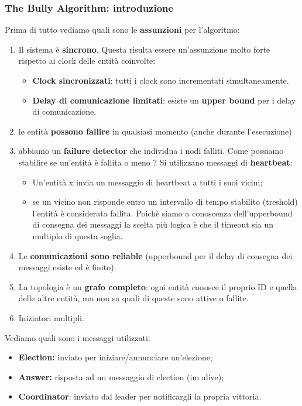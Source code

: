 \documentclass[12pt]{article}
\begin{document}
		\subsubsection{The Bully Algorithm: introduzione}
			Prima di tutto vediamo quali sono le \textbf{assunzioni} per l'algoritmo:
			\begin{enumerate}
				\item Il sistema è \textbf{sincrono}. Questa risulta essere un'assunzione molto forte rispetto ai clock delle entità coinvolte:
				\begin{itemize}
					\item \textbf{Clock sincronizzati}: tutti i clock sono incrementati simultaneamente.
					\item \textbf{Delay di comunicazione limitati}: esiste un \textbf{upper bound} per i delay di comunicazione.  
				\end{itemize}
				\item le entità \textbf{possono fallire} in qualsiasi momento (anche durante l'esecuzione)
				\item abbiamo un \textbf{failure detector} che individua i nodi falliti. Come possiamo stabilire se un'entità è fallita o meno ? Si utilizzano messaggi di \textbf{heartbeat}:
				\begin{itemize}
					\item Un'entità x invia un messaggio di heartbeat a tutti i suoi vicini;
					\item se un vicino non risponde entro un intervallo di tempo stabilito (treshold) l'entità è considerata fallita. Poichè siamo a conoscenza dell'upperbound di consegna dei messaggi la scelta più logica è che il timeout sia un multiplo di questa soglia.
				\end{itemize}
				\item Le \textbf{comunicazioni sono reliable} (upperbound per il delay di consegna dei messaggi esiste ed è finito).
				\item La topologia è un \textbf{grafo completo}: ogni entità conosce il proprio ID e 	quella delle altre entità, ma non sa quali di queste sono  attive o fallite.
				\item Iniziatori multipli.
			\end{enumerate}
			Vediamo quali sono i messaggi utilizzati:
			\begin{itemize}
				\item \textbf{Election:} inviato per iniziare/annunciare un'elezione;
				\item \textbf{Answer:} risposta ad un messaggio di election (im alive);
				\item \textbf{Coordinator}: inviato dal leader per notificargli la propria vittoria.
			\end{itemize}
\end{document}

